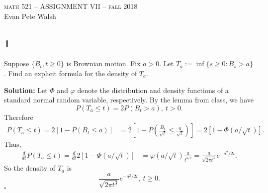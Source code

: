 \documentclass[12pt]{article}
\newcounter{ProofCounter}
\newenvironment{Solution}{\stepcounter{ProofCounter}\textbf{Solution:}}{\hfill$\square$}
\begin{document}
\thispagestyle{empty}
\begin{center}
  \Large \textsc{math 521 -- ASSIGNMENT VII -- fall 2018} \\ 
  \vspace{5mm}
  \large Evan Pete Walsh
\end{center}


\subsection*{1}
\begin{tcolorbox}
  Suppose $\{ B_t, t \geq 0\}$ is Brownian motion. Fix $a > 0$. Let $T_a := \inf\{ s \geq 0 : B_s > a\}$. Find an explicit formula for the density of $T_a$.
\end{tcolorbox}
\begin{Solution}
  Let $\Phi$ and $\varphi$ denote the distribution and density functions of a standard normal random variable, respectively. By the lemma from class, we have
  \begin{equation}
    P(T_a \leq t) = 2P(B_t > a), \ t > 0.
    \label{1.1}
  \end{equation}
  Therefore
  \begin{align*}
    P(T_a \leq t) = 2[1 - P(B_t \leq a)] & = 2 \left[ 1 - P \left( \frac{B_t}{\sqrt{t}} \leq \frac{a}{\sqrt{t}} \right) \right] = 2[1 - \Phi(a/\sqrt{t})].
  \end{align*}
  Thus,
  \begin{align*}
    \frac{d}{dt} P(T_a \leq t) = \frac{d}{dt} 2[1 - \Phi(a/\sqrt{t})] & = \varphi(a/\sqrt{t}) \frac{a}{t^{3/2}} = \frac{a}{\sqrt{2 \pi t^3}} e^{-a^2 / 2t}.
  \end{align*}
  So the density of $T_a$ is
  \[
    \frac{a}{\sqrt{2 \pi t^3}} e^{-a^2 / 2t}, \ t \geq 0.
  \]
\end{Solution}

\end{document}
